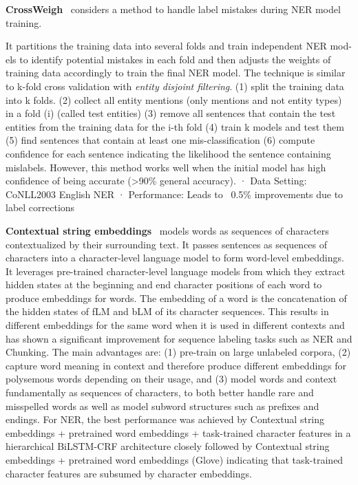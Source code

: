 \textbf{CrossWeigh}~\cite{WangSLLLH19} considers a method to handle label mistakes during NER model training.

It partitions the training data into several folds and train independent NER mod- els to identify potential mistakes in each fold and then adjusts the weights of training data accordingly to train the final NER model.
The technique is similar to k-fold cross validation with \textit{entity disjoint filtering}.
(1) split the training data into k folds.
(2) collect all entity mentions (only mentions and not entity types)  in a fold (i) (called test entities)
(3) remove all sentences that contain the test entities from the training data for the i-th fold 
(4) train k models and test them
(5) find sentences that contain at least one mis-classification
(6) compute confidence for each sentence indicating the likelihood the sentence containing  mislabels.
However, this method works well when the initial model has high confidence of being accurate (>90\% general accuracy).
·        Data Setting: CoNLL2003 English NER
·        Performance: Leads to ~0.5\% improvements due to label corrections

\textbf{Contextual string embeddings}~\cite{akbik-etal-2018-contextual} models words as sequences of characters contextualized by their surrounding text.
It passes  sentences as sequences of characters into a character-level language model to form word-level embeddings.
It leverages pre-trained character-level language models from which they extract hidden states at the beginning and end character positions of each word to produce embeddings for words.
The embedding of a word is the concatenation of the hidden states of fLM and bLM of its character sequences.
This results in different embeddings for the same word when it is used in different contexts and has shown a significant improvement for sequence labeling tasks such as NER and Chunking.
The main advantages are: (1) pre-train on large unlabeled corpora, (2) capture word meaning in context and therefore produce different embeddings for polysemous words depending on their usage, and (3) model words and context fundamentally as sequences of characters, to both better handle rare and misspelled words as well as model subword structures such as prefixes and endings.
For NER, the best performance was achieved by Contextual string embeddings + pretrained word embeddings + task-trained character features in a hierarchical BiLSTM-CRF architecture 
closely followed by Contextual string embeddings + pretrained word embeddings (Glove) indicating that task-trained character features are subsumed by character embeddings.


